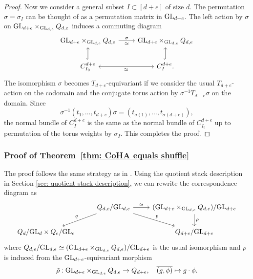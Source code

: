 \documentclass[10pt]{amsart}
\newcommand{\+}{{}^+}
\newcommand{\GL}{\textnormal{GL}}
\theoremstyle{definition}
\theoremstyle {definition}
\theoremstyle {definition}
\begin{document}
\begin{proof}
Now we consider a general subset $I\subset[d+e]$ of size $d$. The permutation $\sigma=\sigma_I$ can be thought of as a permutation matrix in $\GL_{d+e}$. The left action by $\sigma$ on ${\GL_{d+e}\times_{\GL_{d,e}}Q_{d,e}}$ induces a commuting diagram
\begin{equation}\label{eq: useful diagram}
    \begin{tikzcd}
{{\GL_{d+e}\times_{\GL_{d,e}}Q_{d,e}}} \arrow[r, "\sigma", "\simeq"'] & {{\GL_{d+e}\times_{\GL_{d,e}}Q_{d,e}}} \\
C^{d+e}_{I_0} \arrow[r, leftrightarrow, "\simeq"'] \arrow[u, hook]                    & C^{d+e}_I. \arrow[u, hook]       
\end{tikzcd}
\end{equation}
The isomorphism $\sigma$ becomes $T_{d+e}$-equivariant if we consider the usual $T_{d+e}$-action on the codomain and the conjugate torus action by $\sigma^{-1} T_{d+e}\sigma$ on the domain. Since $$\sigma^{-1} (t_1,\dots,t_{d+e})\sigma = (t_{\sigma(1)}, \dots, t_{\sigma(d+e)}),$$
the normal bundle of $C^{d+e}_I$ is the same as the normal bundle of $C^{d+e}_{I_0}$ up to permutation of the torus weights by $\sigma_I$. This completes the proof. 


\end{proof}




\subsubsection{Proof of Theorem~\ref{thm: CoHA equals shuffle}}



The proof follows the same strategy as in \cite[Thm. 2]{Kontsevich_Soibelman}. Using the quotient stack description in Section \ref{sec: quotient stack description}, we can rewrite the correspondence diagram as 
\[\begin{tikzcd}[ampersand replacement=\&]
	\& {Q_{d,e}/\GL_{d,e}} \& {(\GL_{d+e}\times_{\GL_{d,e}}Q_{d,e})/\GL_{d+e}} \\
	{Q_{d}/\mathrm{GL}_{d} \times Q_{e}/\mathrm{GL}_{e}} \&\& {Q_{d+e}/\mathrm{GL}_{d+e}}
	\arrow["\simeq", from=1-2, to=1-3]
	\arrow["q"', from=1-2, to=2-1]
	\arrow["p", from=1-2, to=2-3]
	\arrow["\rho", from=1-3, to=2-3]
\end{tikzcd}\] where $Q_{d,e}/\GL_{d,e}\simeq (\GL_{d+e}\times_{\GL_{d,e}}Q_{d,e})/\GL_{d+e}$ is the usual isomorphism and $\rho$ is induced from the $\GL_{d+e}$-equivariant morphism 
$$\tilde\rho:\GL_{d+e}\times_{\GL_{d,e}}Q_{d,e}\rightarrow Q_{d+e},\quad \overline{(g,\phi)}\mapsto g\cdot \phi.
$$
\end{document}
